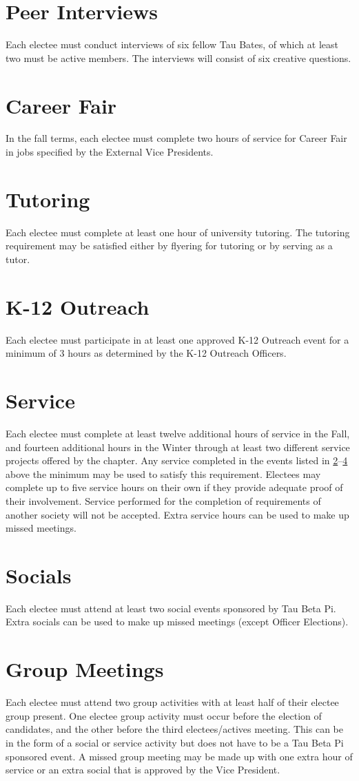 \section{Peer Interviews} Each electee must conduct interviews of six fellow Tau Bates, of which at least two must be active members. The interviews will consist of six creative questions. 
\section{Career Fair}\label{ugrad:CF} In the fall terms, each electee must complete two hours of service for Career Fair in jobs specified by the External Vice Presidents. 
\section{Tutoring} Each electee must complete at least one hour of university tutoring. The tutoring requirement may be satisfied either by flyering for tutoring or by serving as a tutor.
\section{K-12 Outreach} \label{ugrad:MindSET} Each electee must participate in at least one approved K-12 Outreach event for a minimum of 3 hours as determined by the K-12 Outreach Officers.
\section{Service} Each electee must complete at least twelve additional hours of service in the Fall, and fourteen additional hours in the Winter through at least two different service projects offered by the chapter. Any service completed in the events listed in \ref{ugrad:CF}--\ref{ugrad:MindSET} above the minimum may be used to satisfy this requirement. Electees may complete up to five service hours on their own if they provide adequate proof of their involvement. Service performed for the completion of requirements of another society will not be accepted. Extra service hours can be used to make up missed meetings.
\section{Socials} Each electee must attend at least two social events sponsored by Tau Beta Pi. Extra socials can be used to make up missed meetings (except Officer Elections).
\section{Group Meetings} \label{group_meetings} Each electee must attend two group activities with at least half of their electee group present. One electee group activity must occur before the election of candidates, and the other before the third electees/actives meeting. This can be in the form of a social or service activity but does not have to be a Tau Beta Pi sponsored event. A missed group meeting may be made up with one extra hour of service or an extra social that is approved by the Vice President.
